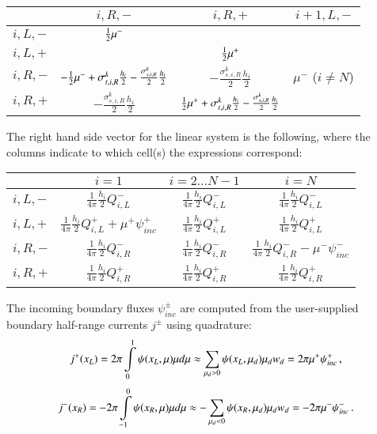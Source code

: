 \documentclass[preprint,12pt]{elsarticle}
\newcommand{\sigsR}{\frac{\sigma_{s,i,R}^k}{2}}
\newcommand{\sigtR}{\sigma_{t,i,R}^k}
\newcommand{\halfh}{\frac{h_i}{2}}
\begin{document}
\begin{center}
\begin{tabular}{|l||c|c|c|}\hline
          & $i,R,-$ & $i,R,+$ & $i+1,L,-$\\\hline\hline
  $i,L,-$ & $\frac{1}{2}\mu^-$
          &
          & \\\hline
  $i,L,+$ &
          & $\frac{1}{2}\mu^+$
          & \\\hline
  $i,R,-$ & $-\half\mu^- + \sigtR\halfh - \sigsR\halfh$
          & $-\sigsR\halfh$
          & $\mu^-$ ($i\ne N$) \\\hline
  $i,R,+$ & $-\sigsR\halfh$
          & $\half\mu^+ + \sigtR\halfh - \sigsR\halfh$
          & \\\hline
\end{tabular}
\end{center}
The right hand side vector for the linear system is the following,
where the columns indicate to which cell(s) the expressions
correspond:

\begin{center}
\begin{tabular}{|l||c|c|c|}\hline
          & $i=1$ & $i=2\ldots N-1$ & $i=N$\\\hline\hline
  $i,L,-$ & $\frac{1}{4\pi}\frac{h_i}{2}Q^-_{i,L}$
          & $\frac{1}{4\pi}\frac{h_i}{2}Q^-_{i,L}$
          & $\frac{1}{4\pi}\frac{h_i}{2}Q^-_{i,L}$ \\\hline
  $i,L,+$ & $\frac{1}{4\pi}\frac{h_i}{2}Q^+_{i,L} + \mu^+\psi^+_{inc}$
          & $\frac{1}{4\pi}\frac{h_i}{2}Q^+_{i,L}$
          & $\frac{1}{4\pi}\frac{h_i}{2}Q^+_{i,L}$ \\\hline
  $i,R,-$ & $\frac{1}{4\pi}\frac{h_i}{2}Q^-_{i,R}$
          & $\frac{1}{4\pi}\frac{h_i}{2}Q^-_{i,R}$
          & $\frac{1}{4\pi}\frac{h_i}{2}Q^-_{i,R} - \mu^-\psi^-_{inc}$ \\\hline
  $i,R,+$ & $\frac{1}{4\pi}\frac{h_i}{2}Q^+_{i,R}$
          & $\frac{1}{4\pi}\frac{h_i}{2}Q^+_{i,R}$
          & $\frac{1}{4\pi}\frac{h_i}{2}Q^+_{i,R}$ \\\hline
\end{tabular}
\end{center}
The incoming boundary fluxes $\psi^\pm_{inc}$ are computed from the
user-supplied boundary half-range currents $j^\pm$ using quadrature:
\begin{equation}
   j^+(x_L) = 2\pi\int\limits_0^1 \psi(x_L,\mu)\mu d\mu
   \approx \sum\limits_{\mu_d>0}\psi(x_L,\mu_d)\mu_d w_d
   = 2\pi\mu^+\psi^+_{inc} \, ,
\end{equation}
\begin{equation}
   j^-(x_R) = -2\pi\int\limits_{-1}^0 \psi(x_R,\mu)\mu d\mu
   \approx -\sum\limits_{\mu_d<0}\psi(x_R,\mu_d)\mu_d w_d
   = -2\pi\mu^-\psi^-_{inc} \, .
\end{equation}
\end{document}
